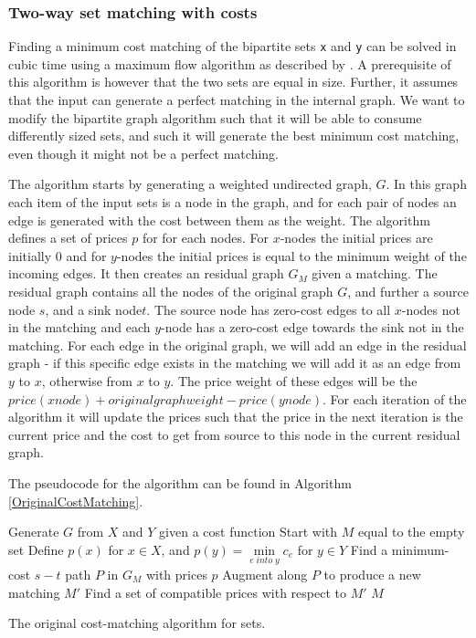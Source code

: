 \documentclass[11pt]{article}
\begin{document}
\subsubsection{Two-way set matching with costs}
Finding a minimum cost matching of the bipartite sets \texttt{x} and \texttt{y} can be solved in cubic time using a maximum flow algorithm as described by \citet{bipartitecost}. A prerequisite of this algorithm is however that the two sets are equal in size. Further, it assumes that the input can generate a perfect matching in the internal graph. We want to modify the bipartite graph algorithm such that it will be able to consume differently sized sets, and such it will generate the best minimum cost matching, even though it might not be a perfect matching.

The \citet{bipartitecost} algorithm starts by generating a weighted undirected graph, $G$. In this graph each item of the input sets is a node in the graph, and for each pair of nodes an edge is generated with the cost between them as the weight. The algorithm defines a set of prices $p$ for for each nodes. For $x$-nodes the initial prices are initially 0 and for $y$-nodes the initial prices is equal to the minimum weight of the incoming edges. It then creates an residual graph $G_M$ given a matching. The residual graph contains all the nodes of the original graph $G$, and further a source node $s$, and a sink node$t$. The source node has zero-cost edges to all $x$-nodes not in the matching and each $y$-node has a zero-cost edge towards the sink not in the matching. For each edge in the original graph, we will add an edge in the residual graph - if this specific edge exists in the matching we will add it as an edge from $y$ to $x$, otherwise from $x$ to $y$. The price weight of these edges will be the $price(xnode)+originalgraphweight-price(ynode)$. For each iteration of the algorithm it will update the prices such that the price in the next iteration is the current price and the cost to get from source to this node in the current residual graph.

The pseudocode for the algorithm can be found in Algorithm \ref{OriginalCostMatching}.


\begin{algorithm}
\begin{algorithmic}
	\State Generate $G$ from $X$ and $Y$ given a cost function
	\State Start with $M$ equal to the empty set
	\State Define $p(x)$ for $x \in X$, and  $p(y) = \underset{e \; into \; y}{\operatorname{min}} c_e$ for $y \in Y$
    	\State Find a minimum-cost $s-t$ path $P$ in $G_M$ with prices $p$
    	\State Augment along $P$ to produce a new matching $M'$
    	\State Find a set of compatible prices with respect to $M'$
    \EndWhile
	\State \Return $M$
\EndFunction
\end{algorithmic}
	\caption{The original cost-matching algorithm for sets.}
	\label{OriginalCostMatching}
\end{algorithm}
\end{document}
